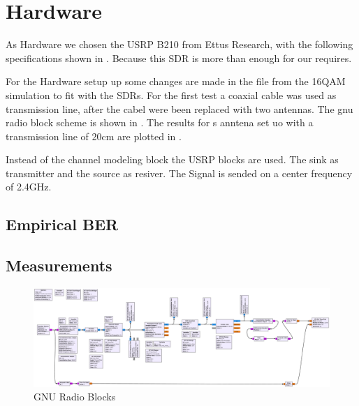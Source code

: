 




\section{Hardware}

As Hardware we chosen the USRP B210 from Ettus Research, with the following specifications shown in . Because this SDR is more than enough for our requires.

For the Hardware setup up some changes are made in the file from the 16QAM simulation to fit with the SDRs. For the first test a coaxial cable was used as transmission line, after the cabel were been replaced with two antennas. The gnu radio block scheme is shown in . The results for s anntena set uo with a transmission line of 20cm  are plotted in .

Instead of the channel modeling block the USRP blocks are used. The sink as transmitter and the source as resiver.  The Signal is sended on a center frequency of 2.4GHz.

\subsection{Empirical BER} \label{sec:ber}

\subsection{Measurements}

%
%
%

\begin{figure}
	\includegraphics[width=\linewidth]{./figures/pdfs/qam_nogui.pdf}
	\caption{GNU Radio Blocks}
	\label{fig:simul16QAM_block}	
\end{figure}

